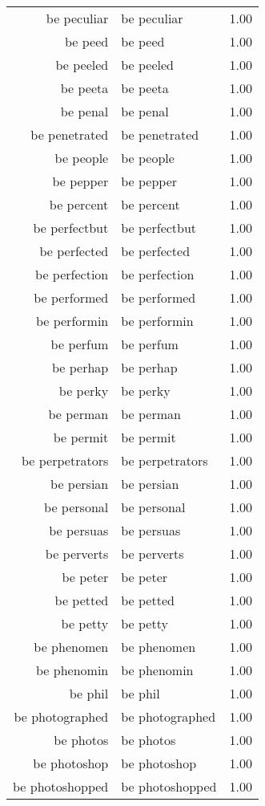 \begin{table}[ht]
\begin{tabular}{rlr}
  be peculiar & be peculiar & 1.00 \\ 
  be peed & be peed & 1.00 \\ 
  be peeled & be peeled & 1.00 \\ 
  be peeta & be peeta & 1.00 \\ 
  be penal & be penal & 1.00 \\ 
  be penetrated & be penetrated & 1.00 \\ 
  be people & be people & 1.00 \\ 
  be pepper & be pepper & 1.00 \\ 
  be percent & be percent & 1.00 \\ 
  be perfectbut & be perfectbut & 1.00 \\ 
  be perfected & be perfected & 1.00 \\ 
  be perfection & be perfection & 1.00 \\ 
  be performed & be performed & 1.00 \\ 
  be performin & be performin & 1.00 \\ 
  be perfum & be perfum & 1.00 \\ 
  be perhap & be perhap & 1.00 \\ 
  be perky & be perky & 1.00 \\ 
  be perman & be perman & 1.00 \\ 
  be permit & be permit & 1.00 \\ 
  be perpetrators & be perpetrators & 1.00 \\ 
  be persian & be persian & 1.00 \\ 
  be personal & be personal & 1.00 \\ 
  be persuas & be persuas & 1.00 \\ 
  be perverts & be perverts & 1.00 \\ 
  be peter & be peter & 1.00 \\ 
  be petted & be petted & 1.00 \\ 
  be petty & be petty & 1.00 \\ 
  be phenomen & be phenomen & 1.00 \\ 
  be phenomin & be phenomin & 1.00 \\ 
  be phil & be phil & 1.00 \\ 
  be photographed & be photographed & 1.00 \\ 
  be photos & be photos & 1.00 \\ 
  be photoshop & be photoshop & 1.00 \\ 
  be photoshopped & be photoshopped & 1.00 \\ 

\end{tabular}
\end{table}
